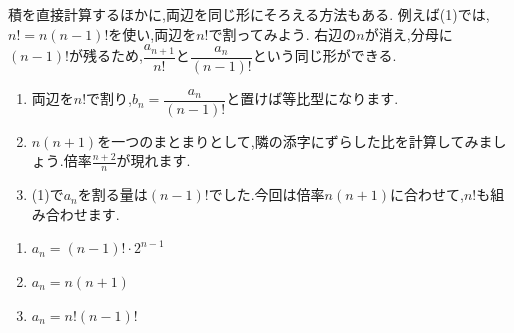     \noindent{}\par\nobreak
    積を直接計算するほかに,両辺を同じ形にそろえる方法もある.
    例えば(1)では,$n!=n(n-1)!$を使い,両辺を$n!$で割ってみよう.
    右辺の$n$が消え,分母に$(n-1)!$が残るため,$\dfrac{a_{n+1}}{n!}$と$\dfrac{a_n}{(n-1)!}$という同じ形ができる.
    \begin{enumerate}[label=(\arabic*),parsep=3pt,format=\bookitemlink{example-ratio-1}{hint}{problem}]
      \item 両辺を$n!$で割り,$b_n=\dfrac{a_n}{(n-1)!}$と置けば等比型になります.
      \item $n(n+1)$を一つのまとまりとして,隣の添字にずらした比を計算してみましょう.倍率$\frac{n+2}{n}$が現れます.
      \item (1)で$a_n$を割る量は$(n-1)!$でした.今回は倍率$n(n+1)$に合わせて,$n!$も組み合わせます.
    \end{enumerate}

    \noindent{}\par\nobreak
    \begin{enumerate}[label=(\arabic*),parsep=3pt,format=\bookitemlink{example-ratio-1}{answer}{problem}]
      \item $\displaystyle a_n=(n-1)!\cdot 2^{n-1}$
      \item $\displaystyle a_n=n(n+1)$
      \item $\displaystyle a_n=n!(n-1)!$
    \end{enumerate}

